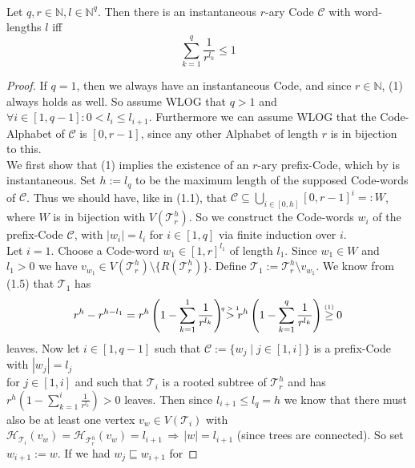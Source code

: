 \documentclass[12pt]{article}
\newcommand{\up}[2]{\mathrel{\overset{\makebox[0pt]{\mbox{\normalfont\tiny #2}}}{#1}}}
\newcommand{\T}[0]{{\mathcal{T}_r^h}}
\newenvironment{statement3}[3]{\begin{trivlist}
\item[\hskip \labelsep {\bfseries #1}\hskip \labelsep {\bfseries #2} {#3}\textbf{.}]}{\end{trivlist}}
\begin{document}
\begin{statement3}{(1.6)}{Theorem}{(Kraft's Inequality)}\strut\\[2pt]
    Let $q,r \in \mathbb{N}, l \in \mathbb{N}^q$. Then there is an instantaneous $r$-ary Code $\mathcal{C}$
    with word-lengths $l$ iff
    \begin{equation}
        \sum_{k=1}^{q} \frac{1}{r^{l_k}} \leq 1
    \end{equation}

    \begin{proof}
        If $q = 1$, then we always have an instantaneous Code, and since $r \in \mathbb{N}$, (1) always holds
        as well.
        So assume WLOG that $q > 1$ and $\forall i \in [1,q-1]: 0 < l_i \leq l_{i+1}$.
        Furthermore we can assume WLOG that the Code-Alphabet of $\mathcal{C}$ is $[0,r-1]$, since any
        other Alphabet of length $r$ is in bijection to this.\\[10pt]
        We first show that (1) implies the existence of an $r$-ary prefix-Code, which by
        \cite{ICT} is instantaneous.
        Set $h := l_q$ to be the maximum length of the supposed Code-words of $\mathcal{C}$.
        Thus we should have, like in (1.1), that $\mathcal{C} \subseteq \bigcup_{i \in [0,h]} [0,r-1]^i =: W$, where
        $W$ is in bijection with $V(\T)$.
        So we construct the Code-words $w_i$ of the prefix-Code $\mathcal{C}$, with $|w_i| = l_i$ for $i \in [1,q]$
        via finite induction over $i$.\\[5pt]
        Let $i = 1$. Choose a Code-word $w_1 \in [1,r]^{l_1}$ of length $l_1$. Since $w_1 \in W$ and $l_1 > 0$ we have
        $v_{w_1} \in V(\T) \setminus \{R(\T)\}$. Define $\mathcal{T}_1 := \T \setminus v_{w_1}$. We know
        from (1.5) that $\mathcal{T}_1$ has
        $$
            r^h - r^{h - l_1} = r^h\left(1 - \sum_{k=1}^{1} \frac{1}{r^{l_k}}\right)
            \up{>}{$q > 1$} r^h\left(1 - \sum_{k=1}^{q} \frac{1}{r^{l_k}}\right) \up{\geq}{(1)} 0
        $$
        leaves. Now let $i \in [1,q-1]$ such that $\mathcal{C} := \{w_j \mid j \in [1,i]\}$ is a prefix-Code
        with $|w_j| = l_j$\\[2pt]
        for $j \in [1,i]$ and such that $\mathcal{T}_i$ is a rooted subtree of $\T$ and has $r^h(1 - \sum_{k=1}^{i}\frac{1}{r^{l_k}}) > 0$ leaves.
        Then since $l_{i+1} \leq l_q = h$ we know that there must also be at least one vertex
        $v_w \in V(\mathcal{T}_i)$ with $\mathcal{H}_{\mathcal{T}_i}(v_w) = \mathcal{H}_{\T}(v_w) = l_{i+1}
        \,\Longrightarrow\, |w| = l_{i+1}$ (since trees are connected). So set $w_{i+1} := w$. If we had $w_j \sqsubseteq w_{i+1}$ for

\end{proof}
\end{statement3}
\end{document}
